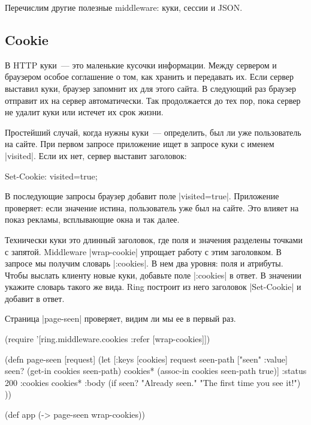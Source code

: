 Перечислим другие полезные middleware: куки, сессии и JSON.

\subsection{Cookie}

В HTTP куки~--- это маленькие кусочки информации. Между сервером и браузером
особое соглашение о том, как хранить и передавать их. Если сервер выставил куки,
браузер запомнит их для этого сайта. В следующий раз браузер отправит их на
сервер автоматически. Так продолжается до тех пор, пока сервер не удалит куки
или истечет их срок жизни.

Простейший случай, когда нужны куки~--- определить, был ли уже пользователь на
сайте. При первом запросе приложение ищет в запросе куки с именем
\spverb|visited|. Если их нет, сервер выставит заголовок:

\begin{english}
  \begin{http}
Set-Cookie: visited=true;
  \end{http}
\end{english}

В последующие запросы браузер добавит поле \spverb|visited=true|. Приложение
проверяет: если значение истина, пользователь уже был на сайте.  Это влияет на
показ рекламы, всплывающие окна и так далее.

Технически куки это длинный заголовок, где поля и значения разделены точками с
запятой. Middleware \spverb|wrap-cookie| упрощает работу с этим заголовком. В
запросе мы получим словарь \spverb|:cookies|. В нем два уровня: поля и
атрибуты. Чтобы выслать клиенту новые куки, добавьте поле \spverb|:cookies| в
ответ. В значении укажите словарь такого же вида. Ring построит из него
заголовок \spverb|Set-Cookie| и добавит в ответ.

Страница \spverb|page-seen| проверяет, видим ли мы ее в первый раз.

\begin{english}
  \begin{clojure}
(require '[ring.middleware.cookies
           :refer [wrap-cookies]])

(defn page-seen [request]
  (let [{:keys [cookies]} request
        seen-path ["seen" :value]
        seen? (get-in cookies seen-path)
        cookies* (assoc-in cookies seen-path true)]
    {:status 200
     :cookies cookies*
     :body (if seen?
             "Already seen."
             "The first time you see it!") }))

(def app (-> page-seen
             wrap-cookies))
  \end{clojure}
\end{english}

